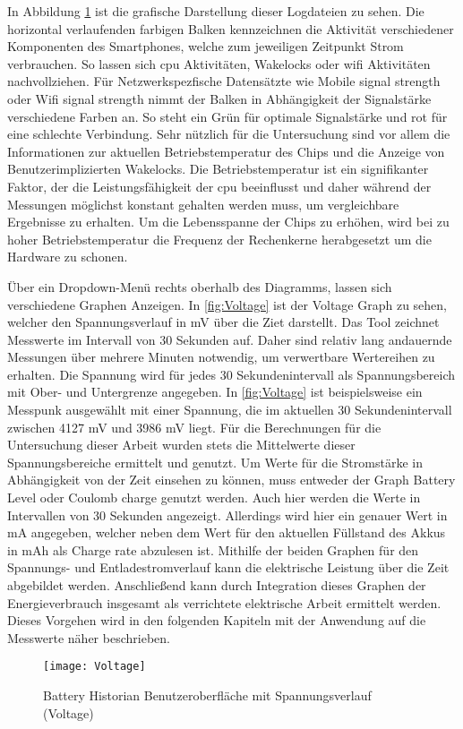 In Abbildung \ref{fig:Voltage} ist die grafische Darstellung dieser Logdateien zu sehen. Die horizontal verlaufenden farbigen Balken kennzeichnen die Aktivität verschiedener Komponenten des Smartphones, welche zum jeweiligen Zeitpunkt Strom verbrauchen. So lassen sich \ac{cpu} Aktivitäten, Wakelocks oder \ac{wifi} Aktivitäten nachvollziehen. Für Netzwerkspezfische Datensätzte wie \glqq Mobile signal strength\grqq{} oder \glqq Wifi signal strength\grqq{} nimmt der Balken in Abhängigkeit der Signalstärke verschiedene Farben an. So steht ein Grün für optimale Signalstärke und rot für eine schlechte Verbindung. Sehr nützlich für die Untersuchung sind vor allem die Informationen zur aktuellen Betriebstemperatur des Chips und die Anzeige von Benutzerimplizierten Wakelocks. Die Betriebstemperatur ist ein signifikanter Faktor, der die Leistungsfähigkeit der \ac{cpu} beeinflusst und daher während der Messungen möglichst konstant gehalten werden muss, um vergleichbare Ergebnisse zu erhalten. Um die Lebensspanne der Chips zu erhöhen, wird bei zu hoher Betriebstemperatur die Frequenz der Rechenkerne herabgesetzt um die Hardware zu schonen.

Über ein Dropdown-Menü rechts oberhalb des Diagramms, lassen sich verschiedene Graphen Anzeigen. In \autoref{fig:Voltage} ist der Voltage Graph zu sehen, welcher den Spannungsverlauf in \ac{mV} über die Ziet darstellt. Das Tool zeichnet Messwerte im Intervall von 30 Sekunden auf. Daher sind relativ lang andauernde Messungen über mehrere Minuten notwendig, um verwertbare Wertereihen zu erhalten. Die Spannung wird für jedes 30 Sekundenintervall als Spannungsbereich mit Ober- und Untergrenze angegeben. In \autoref{fig:Voltage} ist beispielsweise ein Messpunk ausgewählt mit einer Spannung, die im aktuellen 30 Sekundenintervall zwischen 4127 \ac{mV} und 3986 \ac{mV} liegt. Für die Berechnungen für die Untersuchung dieser Arbeit wurden stets die Mittelwerte dieser Spannungsbereiche ermittelt und genutzt. Um Werte für die Stromstärke in Abhängigkeit von der Zeit einsehen zu können, muss entweder der Graph Battery Level oder Coulomb charge genutzt werden. Auch hier werden die Werte in Intervallen von 30 Sekunden angezeigt. Allerdings wird hier ein genauer Wert in \ac{mA} angegeben, welcher neben dem Wert für den aktuellen Füllstand des Akkus in \ac{mAh} als \glqq Charge rate\grqq{} abzulesen ist. Mithilfe der beiden Graphen für den Spannungs- und Entladestromverlauf kann die elektrische Leistung über die Zeit abgebildet werden. Anschließend kann durch Integration dieses Graphen der Energieverbrauch insgesamt als verrichtete elektrische Arbeit ermittelt werden. Dieses Vorgehen wird in den folgenden Kapiteln mit der Anwendung auf die Messwerte näher beschrieben.
\begin{figure}
\begin{center}
	\texttt{[image: Voltage]}
	\caption{Battery Historian Benutzeroberfläche mit Spannungsverlauf (Voltage)}
	\label{fig:Voltage} 
\end{center}
\end{figure}
